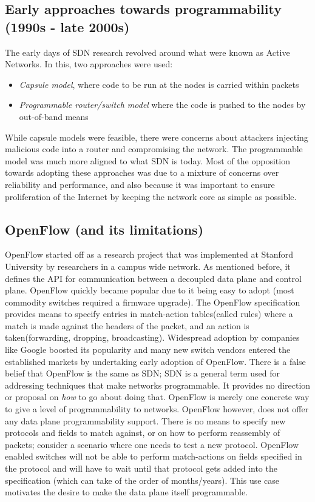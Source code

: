 \subsection{Early approaches towards programmability (1990s - late 2000s)}
The early days of SDN research revolved around what were known as Active Networks\cite{activenet}. In this, two approaches were used:
\begin{itemize}
  \item \textit{Capsule model}, where code to be run at the nodes is carried within packets
  \item \textit{Programmable router/switch model} where the code is pushed to the nodes by out-of-band means 
\end{itemize}

While capsule models were feasible, there were concerns about attackers injecting malicious code into a router and compromising
the network. The programmable model was much more aligned to what SDN is today. Most of the opposition towards adopting these approaches 
was due to a mixture of concerns over reliability and performance, and also because it was important to ensure proliferation
of the Internet by keeping the network core as simple as possible.
\subsection{OpenFlow (and its limitations)}
OpenFlow started off as a research project that was implemented at Stanford University\cite{openflow} by researchers in a campus wide network. As 
mentioned before, it defines the API for communication between a decoupled data plane and control plane. OpenFlow quickly became
popular due to it being easy to adopt (most commodity switches required a firmware upgrade). The OpenFlow specification provides 
means to specify entries in match-action tables(called rules) where a match is made against the headers of the packet, and an
action is taken(forwarding, dropping, broadcasting). Widespread adoption by companies like Google\cite{googleOpenflow} boosted its popularity
and many new switch vendors entered the established markets by undertaking early adoption of OpenFlow.
There is a false belief that OpenFlow is the same as SDN; SDN is a general term used for addressing techniques that make networks programmable.
It provides no direction or proposal on \textit{how} to go about doing that.
OpenFlow is merely one concrete way to give a level of programmability to networks.
\newline
OpenFlow however, does not offer any data plane programmability support. There is no means to specify new protocols and fields to 
match against, or on how to perform reassembly of packets; consider a scenario where one needs to test a new protocol. OpenFlow
enabled switches will not be able to perform match-actions on fields specified in the protocol and will have to wait until that
protocol gets added into the specification (which can take of the order of months/years). This use case motivates the desire to make the
data plane itself programmable.
